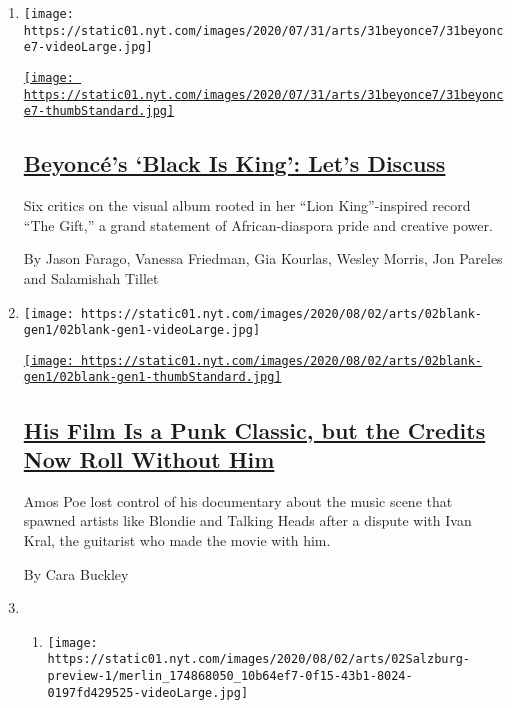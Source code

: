 \begin{enumerate}
\def\labelenumi{\arabic{enumi}.}
\item
  \texttt{[image: https://static01.nyt.com/images/2020/07/31/arts/31beyonce7/31beyonce7-videoLarge.jpg]}

  \href{/2020/07/31/arts/music/beyonce-black-is-king.html}{\texttt{[image: https://static01.nyt.com/images/2020/07/31/arts/31beyonce7/31beyonce7-thumbStandard.jpg]}}

  \hypertarget{beyoncuxe9s-black-is-king-lets-discuss}{%
  \subsection{\texorpdfstring{\href{/2020/07/31/arts/music/beyonce-black-is-king.html}{Beyoncé's
  `Black Is King': Let's
  Discuss}}{Beyoncé's `Black Is King': Let's Discuss}}\label{beyoncuxe9s-black-is-king-lets-discuss}}

  Six critics on the visual album rooted in her ``Lion King''-inspired
  record ``The Gift,'' a grand statement of African-diaspora pride and
  creative power.

  By Jason Farago, Vanessa Friedman, Gia Kourlas, Wesley Morris, Jon
  Pareles and Salamishah Tillet
\item
  \texttt{[image: https://static01.nyt.com/images/2020/08/02/arts/02blank-gen1/02blank-gen1-videoLarge.jpg]}

  \href{/2020/07/30/movies/blank-generation-amos-poe.html}{\texttt{[image: https://static01.nyt.com/images/2020/08/02/arts/02blank-gen1/02blank-gen1-thumbStandard.jpg]}}

  \hypertarget{his-film-is-a-punk-classic-but-the-credits-now-roll-without-him}{%
  \subsection{\texorpdfstring{\href{/2020/07/30/movies/blank-generation-amos-poe.html}{His
  Film Is a Punk Classic, but the Credits Now Roll Without
  Him}}{His Film Is a Punk Classic, but the Credits Now Roll Without Him}}\label{his-film-is-a-punk-classic-but-the-credits-now-roll-without-him}}

  Amos Poe lost control of his documentary about the music scene that
  spawned artists like Blondie and Talking Heads after a dispute with
  Ivan Kral, the guitarist who made the movie with him.

  By Cara Buckley
\item
  \begin{enumerate}
  \def\labelenumii{\arabic{enumii}.}
  \item
    \texttt{[image: https://static01.nyt.com/images/2020/08/02/arts/02Salzburg-preview-1/merlin\_174868050\_10b64ef7-0f15-43b1-8024-0197fd429525-videoLarge.jpg]}


\end{enumerate}
\end{enumerate}
